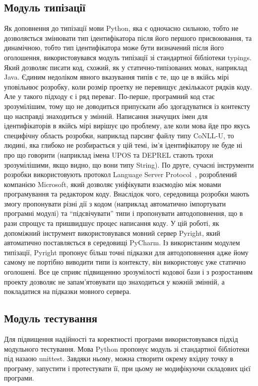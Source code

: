 \subsection{Модуль типізації}
Як доповнення до типізації мови Python, яка є одночасно сильною, тобто не дозволяється змінювати
тип ідентифікатора після його першого присвоювання, та динамічною, тобто тип ідентифікатора
може бути визначений після його оголошення, використовувався модуль типізації зі стандартної
бібліотеки typings. Який дозволяє писати код, схожий,
як у статично-типізованих мовах, наприклад Java.
Єдиним недоліком явного вказування типів є те, що це в якійсь мірі уповільнює розробку, коли
розмір проетку не перевищує декількасот рядків коду. Але у такого підходу є і ряд переваг.
По-перше, програмний код стає зрозумілішим, тому що не доводиться припускати або здогадуватися
із контексту що насправді знаходиться у змінній. Написання значущих імен для ідентифікаторів
в якійсь мірі вирішує цю проблему, але коли мова йде про якусь специфічну область розробки,
наприклад парсинг файлу типу CoNLL-U, то людині, яка глибоко не розбирається у цій темі,
ім'я ідентифікатору не буде ні про що говорити (наприклад імена UPOS та DEPREL стають трохи
зрозумілішими, якщо видно, що вони типу String). По друге, сучасні інструменти розробки
використовують протокол Language Server Protocol~\cite{bib4}, розроблений компанією Microsoft,
який дозволяє уніфікувати взаємодію між мовами програмування та редактором коду. Внаслідок
чого, середовища розробки мають змогу пропонувати різні дії з кодом (наприклад автоматично
імпортувати програмні модулі) та ``підсвічувати'' типи і пропонувати автодоповнення, що в рази
спрощує та пришвидшує процес написання коду. У цій роботі, як допоміжний інструмент
використовувався мовний сервер Pyright, який автоматично поставляється в середовищі PyCharm.
Із використаним модулем типізації, Pyright пропонує більш точні підказки для автодоповнення
адже йому самому не портібно виводити типи із контексту, він використовує уже статично оголошені.
Все це сприяє підвищенню зрозумілості кодової бази і з розростанням проекту дозволяє не
запам'ятовувати що знаходиться у кожній змінній, а покладатися на підказки мовного сервера.

\subsection{Модуль тестування}
Для підвищення надійності та коректності програми використовувався підхід модульного
тестування. Мова Python пропонує модуль зі стандартної бібліотеки під назаою unittest.
Завдяки ньому, можна створити окрему вхідну точку в програму, запустити і протестувати її,
при цьому не модифікуючи складових цієї програми.

